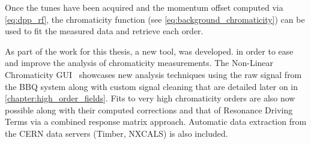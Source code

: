 
Once the tunes have been acquired and the momentum offset computed via \cref{eq:dpp_rf}, the
chromaticity function (see \cref{eq:background_chromaticity}) can be used to fit the
measured data and retrieve each order.

As part of the work for this thesis, a new tool, was developed. in order to ease and improve the
analysis of chromaticity measurements. 
The Non-Linear Chromaticity GUI~\cite{m_le_garrec_non-linear_2022} showcases new analysis techniques
using the raw signal from the BBQ system along with custom signal cleaning that are detailed later
on in \cref{chapter:high_order_fields}. Fits to very high chromaticity orders are also now possible
along with their computed corrections and that of Resonance Driving Terms via a combined response
matrix approach. Automatic data extraction from the CERN data servers (Timber, NXCALS) is also
included.
